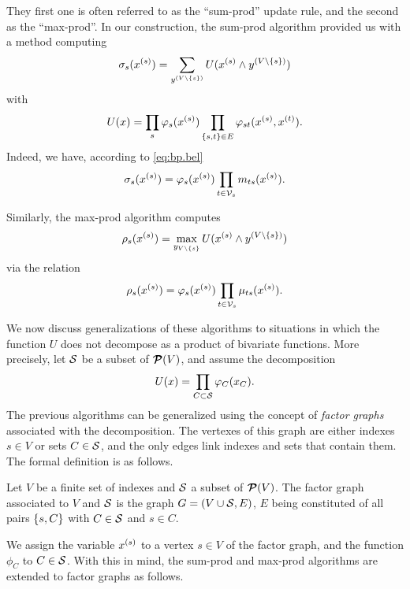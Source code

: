 They first one is often referred to as the ``sum-prod'' update rule,
and the second as the ``max-prod''. In our construction, the sum-prod
algorithm provided us with a method computing
\[
\sigma_s(x^{(s)}) = \sum_{y^{(V\setminus\left\{ s \right\})}} U(x^{(s)}\wedge y^{(V\setminus \{s\})})
\]
with 
\[
U(x) = \prod_{s} \varphi_s(x^{(s)}) \prod_{\left\{ s,t \right\}\in E}
\varphi_{st}(x^{(s)}, x^{(t)}).
\]
Indeed, we have, according to \cref{eq:bp.bel}
\[
\sigma_s(x^{(s)}) = \varphi_s(x^{(s)}) \prod_{t\in {\mathcal V}_s} m_{ts}(x^{(s)}).
\]

Similarly, the max-prod algorithm computes
\[
\rho_s(x^{(s)}) = \max_{y_{V\setminus\left\{ s \right\}}} U(x^{(s)}\wedge y^{(V\setminus \{s\})})
\]
via the relation
\[
\rho_s(x^{(s)}) = \varphi_s(x^{(s)}) \prod_{t\in {\mathcal V}_s} \mu_{ts}(x^{(s)}).
\]

We now discuss generalizations of these algorithms to situations in
which the function $U$ does not decompose as a product of bivariate
functions. More precisely, let ${\mathcal S}$ be a subset of ${\bm{\mathcal P}({V})}$,
and assume the decomposition
$$
U(x) = \prod_{C\subset {\mathcal S}} \varphi_C(x_C). 
$$
The previous algorithms can be generalized  using the concept of {\em factor
graphs} associated with the decomposition. The vertexes of this graph
are either indexes $s\in V$ or sets $C\in {\mathcal S}$, and the only edges link  indexes and sets that contain them. The formal definition is
as follows.
\begin{definition}
\label{def:fact.grph}
Let $V$ be a finite set of indexes and ${\mathcal S}$ a subset of ${\bm{\mathcal P}({V})}$. The
factor graph associated to $V$ and ${\mathcal S}$ is the graph $G=(V\cup
{\mathcal S},E)$, $E$ being constituted of all pairs $\left\{ s,C \right\}$ with $C\in
{\mathcal S}$ and $s\in C$.
\end{definition}
We assign the variable
$x^{(s)}$ to a vertex $s\in V$ of the factor graph, and  the function
$\phi_C$ to $C\in{\mathcal S}$. With this in mind,
the sum-prod and max-prod algorithms are extended to factor graphs as
follows.

